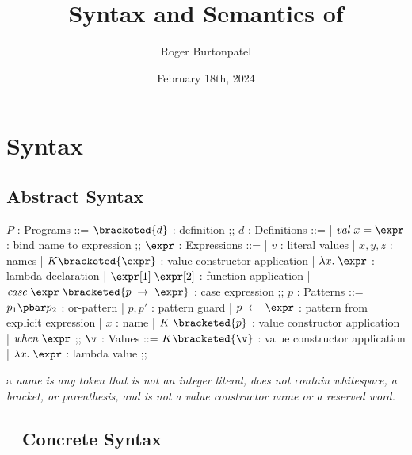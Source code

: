 \documentclass[]{article}
\title{Syntax and Semantics of {\PPlus}}
\author{Roger Burtonpatel}
\date{February 18th, 2024}
\begin{document}
\maketitle

\section{Syntax}

\subsection{{\PPlus} Abstract Syntax}

\bigskip

\begin{center}
    \begin{bnf}
    $P$ : \textsf{Programs} ::=
    $\bracketed{d}$ : definition
    ;;
    $d$ : \textsf{Definitions} ::=
    | $\mathit{val}\; x\; \tt{=}\; \expr$ : bind name to expression
    ;;
    $\expr$ : Expressions ::= 
    | $v$ : literal values 
    | $x, y, z$ : names
    | $K\bracketed{\expr}$ : value constructor application 
    | $\lambda x.\; \expr$ : lambda declaration  
    | $\expr[1]\; \expr[2]$ : function application 
    | $\mathit{case}\; \expr\; \bracketed{p\; \rightarrow\; \expr}$ : case expression 
    ;;
    $p$ : \textsf{Patterns} ::= $p_{1}\pbar p_{2}$ : or-pattern
    | $p, p'$ : pattern guard 
    | $p\; \leftarrow\; \expr$ : pattern from explicit expression  
    | $x$ : name 
    | $K\; \bracketed{p}$ : value constructor application 
    | $\mathit{when}\; \expr$
    ;;
    $\v$ : Values ::= $K\bracketed{\v}$ : value constructor application 
    | $\lambda x.\; \expr$ : lambda value 
    ;;
    \end{bnf}
\end{center}


a \it{name} is any token that is not an integer literal, 
does not contain whitespace, a bracket, or parenthesis, 
and is not a value constructor name or a reserved word.

\vfilbreak

\subsection{{\PPlus}~ Concrete Syntax}

\bigskip
\end{document}
